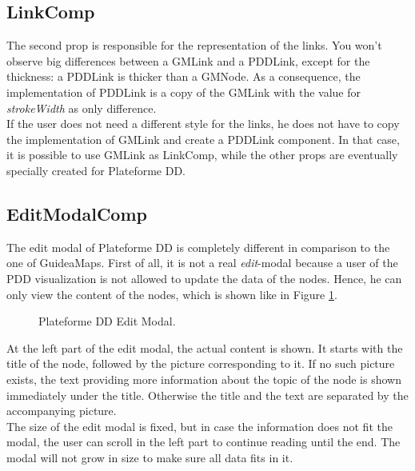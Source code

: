 \subsection{LinkComp}\label{sec:usecase-linkcomp}
The second prop is responsible for the representation of the links. You won't observe big differences between a GMLink and a PDDLink, except for the thickness: a PDDLink is thicker than a GMNode. As a consequence, the implementation of PDDLink is a copy of the GMLink with the value for \textit{strokeWidth} as only difference. \\

If the user does not need a different style for the links, he does not have to copy the implementation of GMLink and create a PDDLink component. In that case, it is possible to use GMLink as LinkComp, while the other props are eventually specially created for Plateforme DD.



\subsection{EditModalComp}\label{sec:usecase-editmodalcomp}
The edit modal of Plateforme DD is completely different in comparison to the one of GuideaMaps. First of all, it is not a real \textit{edit}-modal because a user of the PDD visualization is not allowed to update the data of the nodes. Hence, he can only view the content of the nodes, which is shown like in Figure \ref{fig:pdd-editmodal}.

\begin{figure}[H]
	\centering
	\caption{Plateforme DD Edit Modal.}
	\label{fig:pdd-editmodal}
\end{figure}

At the left part of the edit modal, the actual content is shown. It starts with the title of the node, followed by the picture corresponding to it. If no such picture exists, the text providing more information about the topic of the node is shown immediately under the title. Otherwise the title and the text are separated by the accompanying picture.\\

The size of the edit modal is fixed, but in case the information does not fit the modal, the user can scroll in the left part to continue reading until the end. The modal will not grow in size to make sure all data fits in it.\\

